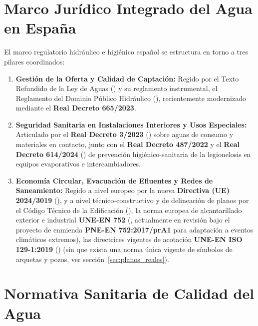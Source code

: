 \documentclass{report}
\begin{document}
\section{Marco Jurídico Integrado del Agua en España}

El marco regulatorio hidráulico e higiénico español se estructura en torno a tres pilares coordinados:
\begin{enumerate}
    \item \textbf{Gestión de la Oferta y Calidad de Captación:} Regido por el Texto Refundido de la Ley de Aguas (\cite{TRLA2001}) y su reglamento instrumental, el Reglamento del Dominio Público Hidráulico (\cite{RDPH1986}), recientemente modernizado mediante el \textbf{Real Decreto 665/2023}.
    \item \textbf{Seguridad Sanitaria en Instalaciones Interiores y Usos Especiales:} Articulado por el \textbf{Real Decreto 3/2023} (\cite{RD3_2023}) sobre aguas de consumo y materiales en contacto, junto con el \textbf{Real Decreto 487/2022} y el \textbf{Real Decreto 614/2024} (\cite{RD487_2022, RD614_2024}) de prevención higiénico-sanitaria de la legionelosis en equipos evaporativos e intercambiadores.
    \item \textbf{Economía Circular, Evacuación de Efluentes y Redes de Saneamiento:} Regido a nivel europeo por la nueva \textbf{Directiva (UE) 2024/3019} (\cite{DirectivaUE_2024_3019}), y a nivel técnico-constructivo y de delineación de planos por el Código Técnico de la Edificación (\cite{CTE_DB_HS5}), la norma europea de alcantarillado exterior e industrial \textbf{UNE-EN 752} (\cite{UNE_EN_752}, actualmente en revisión bajo el proyecto de enmienda \textbf{PNE-EN 752:2017/prA1} para adaptación a eventos climáticos extremos), las directrices vigentes de acotación \textbf{UNE-EN ISO 129-1:2019} (\cite{UNE_EN_ISO_129_1}) (sin que exista una norma única vigente de símbolos de arquetas y pozos, ver sección~\ref{sec:planos_reales}).
\end{enumerate}

\section{Normativa Sanitaria de Calidad del Agua}
\end{document}
